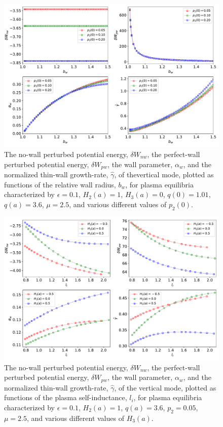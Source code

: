\documentclass[12pt,prb,aps]{revtex4-1}
\begin{document}
\newpage
\begin{figure}
\centerline{\includegraphics[width=\textwidth]{Fig6.pdf}}
\caption{The no-wall perturbed potential energy, $\delta W_{nw}$, the perfect-wall perturbed potential energy, $\delta W_{pw}$, the wall
parameter, $\alpha_w$, and the normalized thin-wall growth-rate, $\hat{\gamma}$,  of thevertical mode, plotted as  functions of the
relative wall radius, $b_w$, for plasma equilibria characterized by  $\epsilon=0.1$, $H_2(a)=1$, $H_3(a)=0$, $q(0)=1.01$, $q(a)=3.6$, $\mu=2.5$, and various different values of $p_2(0)$.\label{fig6}}
\end{figure}

\newpage
\begin{figure}
\centerline{\includegraphics[width=\textwidth]{Fig7.pdf}}
\caption{The no-wall perturbed potential energy, $\delta W_{nw}$, the perfect-wall perturbed potential energy, $\delta W_{pw}$, the wall
parameter, $\alpha_w$, and the normalized thin-wall growth-rate, $\hat{\gamma}$,  of the vertical mode, plotted as  functions of the
plasma self-inductance, $l_i$, for plasma equilibria characterized by  $\epsilon=0.1$, $H_2(a)=1$,   $q(a)=3.6$, $p_2=0.05$, $\mu=2.5$, and various different values of $H_3(a)$.\label{fig7}}
\end{figure}
\end{document}
